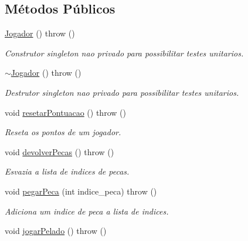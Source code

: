 \subsection*{Métodos Públicos}
\begin{DoxyCompactItemize}
\item 
\hypertarget{classJogador_a94a4939138ce04d2f3ceb68257517ac1}{
\hyperlink{classJogador_a94a4939138ce04d2f3ceb68257517ac1}{Jogador} ()  throw ()}
\label{classJogador_a94a4939138ce04d2f3ceb68257517ac1}

\begin{DoxyCompactList}\small\item\em Construtor singleton nao privado para possibilitar testes unitarios. \item\end{DoxyCompactList}\item 
\hypertarget{classJogador_a3e62c32199fc9cfbcf22cf83f9008be6}{
\hyperlink{classJogador_a3e62c32199fc9cfbcf22cf83f9008be6}{$\sim$Jogador} ()  throw ()}
\label{classJogador_a3e62c32199fc9cfbcf22cf83f9008be6}

\begin{DoxyCompactList}\small\item\em Destrutor singleton nao privado para possibilitar testes unitarios. \item\end{DoxyCompactList}\item 
\hypertarget{classJogador_a7ccde2c632166a00e6d91a7b1c7bf030}{
void \hyperlink{classJogador_a7ccde2c632166a00e6d91a7b1c7bf030}{resetarPontuacao} ()  throw ()}
\label{classJogador_a7ccde2c632166a00e6d91a7b1c7bf030}

\begin{DoxyCompactList}\small\item\em Reseta os pontos de um jogador. \item\end{DoxyCompactList}\item 
\hypertarget{classJogador_ab581fd038c970e1de055e2a49ec9c609}{
void \hyperlink{classJogador_ab581fd038c970e1de055e2a49ec9c609}{devolverPecas} ()  throw ()}
\label{classJogador_ab581fd038c970e1de055e2a49ec9c609}

\begin{DoxyCompactList}\small\item\em Esvazia a lista de indices de pecas. \item\end{DoxyCompactList}\item 
void \hyperlink{classJogador_ac4b77743044e2595e7a849f42059e705}{pegarPeca} (int indice\_\-peca)  throw ()
\begin{DoxyCompactList}\small\item\em Adiciona um indice de peca a lista de indices. \item\end{DoxyCompactList}\item 
\hypertarget{classJogador_adebea5e3251e37c04af4bd322af56dc5}{
void \hyperlink{classJogador_adebea5e3251e37c04af4bd322af56dc5}{jogarPelado} ()  throw ()}
\label{classJogador_adebea5e3251e37c04af4bd322af56dc5}


\end{DoxyCompactItemize}
